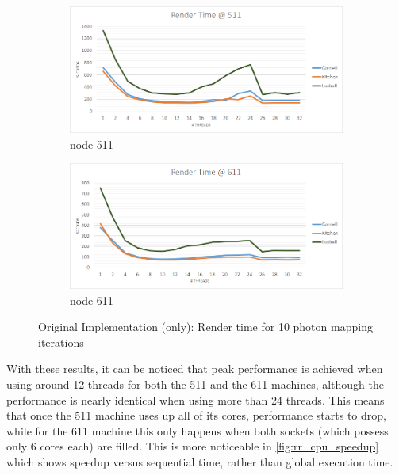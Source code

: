 \documentclass[main.tex]{subfiles}
\begin{document}
\begin{figure}[!htp]
  \centering
  \begin{subfigure}{.5\textwidth}
    \centering
    \includegraphics[width=\linewidth]{excel/rr_cpu_time_511}
    \caption{node 511 \label{fig:rr_cpu_time_511}}
  \end{subfigure}%
  \begin{subfigure}{.5\textwidth}
    \centering
    \includegraphics[width=\linewidth]{excel/rr_cpu_time_611}
    \caption{node 611 \label{fig:rr_cpu_time_611}}
  \end{subfigure}
  \caption{Original Implementation (\cpu only): Render time for 10 photon mapping iterations \label{fig:rr_cpu_time}}
\end{figure}

With these results, it can be noticed that peak performance is achieved when using around 12 \openmp threads for both the 511 and the 611 machines, although the performance is nearly identical when using more than 24 threads. This means that once the 511 machine uses up all of its cores, performance starts to drop, while for the 611 machine this only happens when both sockets (which possess only 6 cores each) are filled. This is more noticeable in \cref{fig:rr_cpu_speedup} which shows speedup versus sequential time, rather than global execution time.
\end{document}
